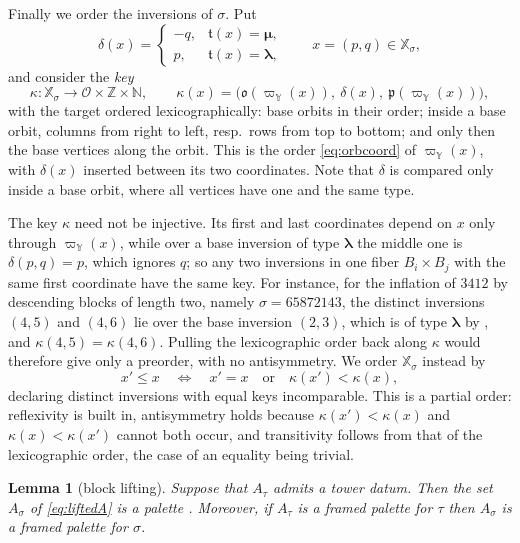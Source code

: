 \documentclass[12pt]{article}
\def\xspace{ }%
\newtheorem{lemma}[lemma]{Lemma}
\theoremstyle{definition}
\newcommand{\pal}{palette\xspace}      %
\newcommand{\fpal}{framed \pal}        %
\newcommand{\pset}{A}                  %
\newcommand{\orbs}{\mathcal{O}}
\newcommand{\orb}{\mathfrak{o}}
\newcommand{\pstn}{\mathfrak{p}}
\newcommand{\typ}{\mathfrak{t}}
\newcommand{\ZZ}{\mathbb{Z}}
\newcommand{\NN}{\mathbb{N}}
\newcommand{\XX}{\mathbb{X}}  %
\newcommand{\YY}{\mathbb{Y}}  %
\newcommand{\blam}{\boldsymbol{\lambda}}   %
\newcommand{\bmu}{\boldsymbol{\mu}}        %
\newcommand{\prjY}{\varpi_{\YY}}           %
\begin{document}
Finally we order the inversions of $\sigma$. Put
\[
   \delta(x) =
   \begin{cases}
      -q, & \typ(x) = \bmu,\\
      p, & \typ(x) = \blam,
   \end{cases}
   \qquad x = (p,q) \in \XX_\sigma ,
\]
and consider the \emph{key}
\begin{equation}\label{eq:towerorder}
   \kappa : \XX_\sigma \longrightarrow \orbs\times\ZZ\times\NN,
   \qquad
   \kappa(x) =
   \bigl(\orb(\prjY(x)),\ \delta(x),\ \pstn(\prjY(x))\bigr) ,
\end{equation}
with the target ordered lexicographically:
base orbits in their order; inside a base orbit, columns from right to
left, resp.\ rows from top to bottom; and only then the base vertices
along the orbit. This is the order \eqref{eq:orbcoord} of $\prjY(x)$, with
$\delta(x)$ inserted between its two coordinates. Note that $\delta$ is compared only inside a
base orbit, where all vertices have one and the same type.

The key $\kappa$ need not be injective. Its first and last coordinates
depend on $x$ only through $\prjY(x)$, while over a base inversion of type
$\blam$ the middle one is $\delta(p,q) = p$, which ignores $q$; so any two
inversions in one fiber $B_i\times B_j$ with the same first coordinate have
the same key. For instance, for the inflation of $3412$ by descending
blocks of length two, namely $\sigma = 65872143$, the distinct inversions
$(4,5)$ and $(4,6)$ lie over the base inversion $(2,3)$, which is of type
$\blam$ by , and $\kappa(4,5) = \kappa(4,6)$. Pulling the
lexicographic order back along $\kappa$ would therefore give only a
preorder, with no antisymmetry. We order $\XX_\sigma$ instead by
\begin{equation}\label{eq:towerpo}
   x' \le x \quad\Longleftrightarrow\quad
   x' = x \quad\text{or}\quad \kappa(x') < \kappa(x) ,
\end{equation}
declaring distinct inversions with equal keys incomparable. This is a
partial order: reflexivity is built in, antisymmetry holds because
$\kappa(x') < \kappa(x)$ and $\kappa(x) < \kappa(x')$ cannot both occur,
and transitivity follows from that of the lexicographic order, the case of
an equality being trivial.

\begin{lemma}[block lifting]\label{lem:blocklift}
Suppose that $\pset_\tau$ admits a tower datum. Then the set $\pset_\sigma$ of
\eqref{eq:liftedA} is a \pal. Moreover, if $\pset_\tau$ is a \fpal for
$\tau$ then $\pset_\sigma$ is a \fpal for $\sigma$.
\end{lemma}
\end{document}
